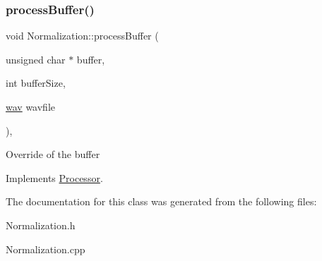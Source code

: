\subsubsection{\texorpdfstring{process\+Buffer()}{processBuffer()}}
{\footnotesize\ttfamily void Normalization\+::process\+Buffer (\begin{DoxyParamCaption}\item[{unsigned char $\ast$}]{buffer,  }\item[{int}]{buffer\+Size,  }\item[{\hyperlink{classwav}{wav}}]{wavfile }\end{DoxyParamCaption})\hspace{0.3cm}{\ttfamily [override]}, {\ttfamily [virtual]}}

Override of the buffer 

Implements \hyperlink{classProcessor_ad81c2b75979636bcee7f5182cdb79a86}{Processor}.



The documentation for this class was generated from the following files\+:\begin{DoxyCompactItemize}
\item 
Normalization.\+h\item 
Normalization.\+cpp\end{DoxyCompactItemize}
